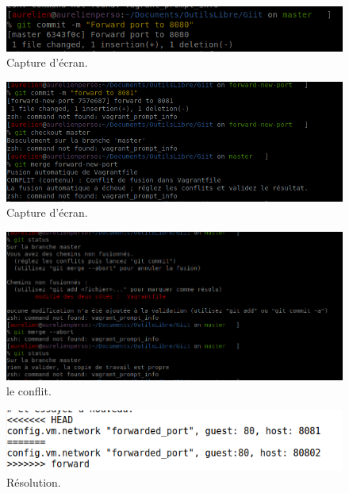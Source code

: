 \documentclass{article}
\begin{document}
\begin{figure}[h]
\centering
\includegraphics[width=0.7\columnwidth]{screen/git3_1.png}
\caption{\label{fig:frog}Capture d'écran.}
\end{figure}

\begin{figure}[h]
\centering
\includegraphics[width=0.7\columnwidth]{screen/git3_2.png}
\caption{\label{fig:frog}Capture d'écran.}
\end{figure}

\begin{figure}[h]
\centering
\includegraphics[width=0.7\columnwidth]{screen/git3_3.png}
\caption{\label{fig:frog}le conflit.}
\end{figure}

\begin{figure}[h]
\centering
\includegraphics[width=0.7\columnwidth]{screen/git3_4.png}
\caption{\label{fig:frog}Résolution.}
\end{figure}
\end{document}
